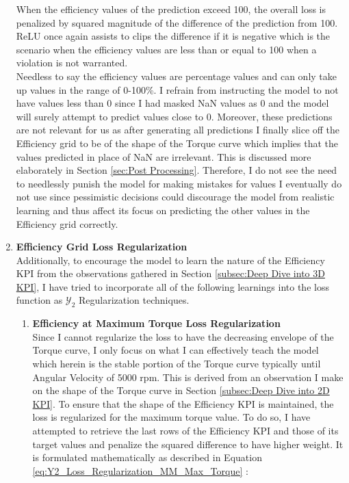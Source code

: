 \documentclass{report} %
\begin{document}
\begin{enumerate}
When the efficiency values of the prediction exceed 100, the overall loss is penalized by squared magnitude of the difference of the prediction from 100.
\ac{ReLU} once again assists to clips the difference if it is negative which is the scenario when the efficiency values are less than or equal to 100 when a violation is not warranted. \\
Needless to say the efficiency values are percentage values and can only take up values in the range of 0-100\%.
I refrain from instructing the model to not have values less than 0 since I had masked \ac{NaN} values as 0 and the model will surely attempt to predict values close to 0.
Moreover, these predictions are not relevant for us as after generating all predictions I finally slice off the Efficiency grid to be of the shape of the Torque curve 
which implies that the values predicted in place of \ac{NaN} are irrelevant. This is discussed more elaborately in Section \ref{sec:Post Processing}.
Therefore, I do not see the need to needlessly punish the model for making mistakes for values I eventually do not use since pessimistic decisions could discourage the 
model from realistic learning and thus affect its focus on predicting the other values in the Efficiency grid correctly.
\item \textbf{Efficiency Grid Loss Regularization} \\
Additionally, to encourage the model to learn the nature of the Efficiency \ac{KPI} from the observations gathered in Section \ref{subsec:Deep Dive into 3D KPI}, I have 
tried to incorporate all of the following learnings into the loss function as $\mathcal{Y}_2$ Regularization techniques.
\begin{enumerate}
\item \textbf{Efficiency at Maximum Torque Loss Regularization} \\
Since I cannot regularize the loss to have the decreasing envelope of the Torque curve, I only focus on what I can effectively teach the model which 
herein is the stable portion of the Torque curve typically until Angular Velocity of 5000 rpm. This is derived from an observation I make on the shape of the Torque 
curve in Section \ref{subsec:Deep Dive into 2D KPI}.
To ensure that the shape of the Efficiency \ac{KPI} is maintained, the loss is regularized for the maximum torque value.
To do so, I have attempted to retrieve the last rows of the Efficiency \ac{KPI} and those of its target values and penalize the squared difference to have higher weight.
It is formulated mathematically as described in Equation \ref{eq:Y2_Loss_Regularization_MM_Max_Torque} :

\end{enumerate}
\end{enumerate}
\end{document}
